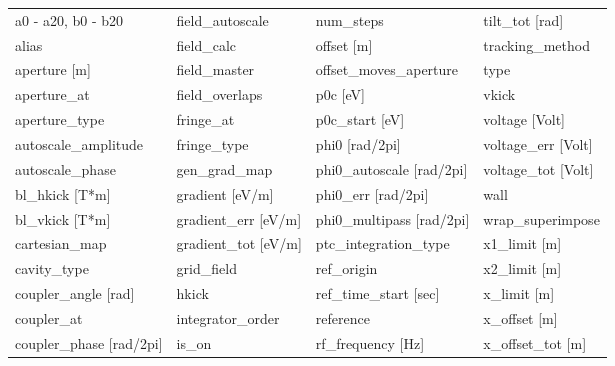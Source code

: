  \begin{tabular}{llll} \toprule
a0 - a20, b0 - b20               & field_autoscale                  & num_steps                        & tilt_tot [rad]                   \\
alias                            & field_calc                       & offset [m]                       & tracking_method                  \\
aperture [m]                     & field_master                     & offset_moves_aperture            & type                             \\
aperture_at                      & field_overlaps                   & p0c [eV]                         & vkick                            \\
aperture_type                    & fringe_at                        & p0c_start [eV]                   & voltage [Volt]                   \\
autoscale_amplitude              & fringe_type                      & phi0 [rad/2pi]                   & voltage_err [Volt]               \\
autoscale_phase                  & gen_grad_map                     & phi0_autoscale [rad/2pi]         & voltage_tot [Volt]               \\
bl_hkick [T*m]                   & gradient [eV/m]                  & phi0_err [rad/2pi]               & wall                             \\
bl_vkick [T*m]                   & gradient_err [eV/m]              & phi0_multipass [rad/2pi]         & wrap_superimpose                 \\
cartesian_map                    & gradient_tot [eV/m]              & ptc_integration_type             & x1_limit [m]                     \\
cavity_type                      & grid_field                       & ref_origin                       & x2_limit [m]                     \\
coupler_angle [rad]              & hkick                            & ref_time_start [sec]             & x_limit [m]                      \\
coupler_at                       & integrator_order                 & reference                        & x_offset [m]                     \\
coupler_phase [rad/2pi]          & is_on                            & rf_frequency [Hz]                & x_offset_tot [m]                 \\

\end{tabular}
